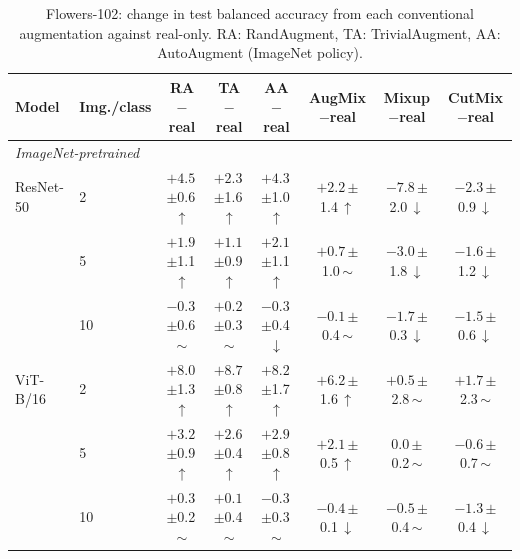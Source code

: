 \begin{table}[htbp]
\centering
\footnotesize
\setlength{\tabcolsep}{4pt}
\caption{Flowers-102: change in test balanced accuracy from each conventional augmentation against real-only. RA: RandAugment, TA: TrivialAugment, AA: AutoAugment (ImageNet policy).}
\label{tab:paper-flowers102-conventional}
\begin{tabular}{llcccccc}
\toprule
Model & Img./class & \shortstack{RA\\$-$real} & \shortstack{TA\\$-$real} & \shortstack{AA\\$-$real} & \shortstack{AugMix\\$-$real} & \shortstack{Mixup\\$-$real} & \shortstack{CutMix\\$-$real} \\
\midrule
\multicolumn{8}{l}{\textit{ImageNet-pretrained}} \\
ResNet-50 & 2 & $+4.5$\,{\scriptsize$\pm$0.6}\,$\uparrow$ & $+2.3$\,{\scriptsize$\pm$1.6}\,$\uparrow$ & $+4.3$\,{\scriptsize$\pm$1.0}\,$\uparrow$ & $+2.2$\,{\scriptsize$\pm$1.4}\,$\uparrow$ & $-7.8$\,{\scriptsize$\pm$2.0}\,$\downarrow$ & $-2.3$\,{\scriptsize$\pm$0.9}\,$\downarrow$ \\
 & 5 & $+1.9$\,{\scriptsize$\pm$1.1}\,$\uparrow$ & $+1.1$\,{\scriptsize$\pm$0.9}\,$\uparrow$ & $+2.1$\,{\scriptsize$\pm$1.1}\,$\uparrow$ & $+0.7$\,{\scriptsize$\pm$1.0}\,$\sim$ & $-3.0$\,{\scriptsize$\pm$1.8}\,$\downarrow$ & $-1.6$\,{\scriptsize$\pm$1.2}\,$\downarrow$ \\
 & 10 & $-0.3$\,{\scriptsize$\pm$0.6}\,$\sim$ & $+0.2$\,{\scriptsize$\pm$0.3}\,$\sim$ & $-0.3$\,{\scriptsize$\pm$0.4}\,$\downarrow$ & $-0.1$\,{\scriptsize$\pm$0.4}\,$\sim$ & $-1.7$\,{\scriptsize$\pm$0.3}\,$\downarrow$ & $-1.5$\,{\scriptsize$\pm$0.6}\,$\downarrow$ \\
\addlinespace[2pt]
ViT-B/16 & 2 & $+8.0$\,{\scriptsize$\pm$1.3}\,$\uparrow$ & $+8.7$\,{\scriptsize$\pm$0.8}\,$\uparrow$ & $+8.2$\,{\scriptsize$\pm$1.7}\,$\uparrow$ & $+6.2$\,{\scriptsize$\pm$1.6}\,$\uparrow$ & $+0.5$\,{\scriptsize$\pm$2.8}\,$\sim$ & $+1.7$\,{\scriptsize$\pm$2.3}\,$\sim$ \\
 & 5 & $+3.2$\,{\scriptsize$\pm$0.9}\,$\uparrow$ & $+2.6$\,{\scriptsize$\pm$0.4}\,$\uparrow$ & $+2.9$\,{\scriptsize$\pm$0.8}\,$\uparrow$ & $+2.1$\,{\scriptsize$\pm$0.5}\,$\uparrow$ & $0.0$\,{\scriptsize$\pm$0.2}\,$\sim$ & $-0.6$\,{\scriptsize$\pm$0.7}\,$\sim$ \\
 & 10 & $+0.3$\,{\scriptsize$\pm$0.2}\,$\sim$ & $+0.1$\,{\scriptsize$\pm$0.4}\,$\sim$ & $-0.3$\,{\scriptsize$\pm$0.3}\,$\sim$ & $-0.4$\,{\scriptsize$\pm$0.1}\,$\downarrow$ & $-0.5$\,{\scriptsize$\pm$0.4}\,$\sim$ & $-1.3$\,{\scriptsize$\pm$0.4}\,$\downarrow$ \\

\end{tabular}
\end{table}
